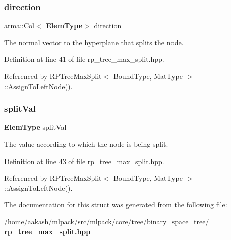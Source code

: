\subsubsection{direction}
{\footnotesize\ttfamily arma\+::\+Col$<$\textbf{ Elem\+Type}$>$ direction}



The normal vector to the hyperplane that splits the node. 



Definition at line 41 of file rp\+\_\+tree\+\_\+max\+\_\+split.\+hpp.



Referenced by R\+P\+Tree\+Max\+Split$<$ Bound\+Type, Mat\+Type $>$\+::\+Assign\+To\+Left\+Node().

\mbox{\label{structmlpack_1_1tree_1_1RPTreeMaxSplit_1_1SplitInfo_a0940adf91ff7f1747d68384a012683d3}} 
\subsubsection{split\+Val}
{\footnotesize\ttfamily \textbf{ Elem\+Type} split\+Val}



The value according to which the node is being split. 



Definition at line 43 of file rp\+\_\+tree\+\_\+max\+\_\+split.\+hpp.



Referenced by R\+P\+Tree\+Max\+Split$<$ Bound\+Type, Mat\+Type $>$\+::\+Assign\+To\+Left\+Node().



The documentation for this struct was generated from the following file\+:\begin{DoxyCompactItemize}
\item 
/home/aakash/mlpack/src/mlpack/core/tree/binary\+\_\+space\+\_\+tree/\textbf{ rp\+\_\+tree\+\_\+max\+\_\+split.\+hpp}\end{DoxyCompactItemize}
